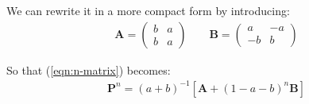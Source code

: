 \documentclass[../template.tex]{subfiles}
\begin{document}
We can rewrite it in a more compact form by introducing:
\begin{align*}
    \textbf{A} = \left(\begin{array}{cc}
    b & a \\ 
    b & a
    \end{array}\right) \qquad \textbf{B} = \left(\begin{array}{cc}
    a & -a \\ 
    -b & b
    \end{array}\right) 
\end{align*}

So that (\ref{eqn:n-matrix}) becomes:
\begin{align}\label{eqn:n-matrix2}
    \textbf{P}^n = (a+b)^{-1} [\textbf{A} + (1-a-b)^n \textbf{B}]   
\end{align}
\end{document}
